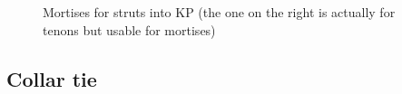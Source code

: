 \documentclass{article}\usepackage[]{graphicx}\usepackage[]{xcolor}
\begin{document}
\begin{figure}[h]
    \hspace{30px}
    \caption{Mortises for struts into KP (the one on the right is actually for tenons but usable for mortises)}
\end{figure}

\newpage


\subsection{Collar tie}
\end{document}
